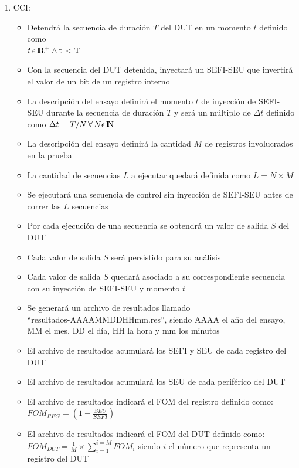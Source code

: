 \documentclass[
11pt, %
]{charter}
\begin{document}
\begin{enumerate}
	\item CCI:
	\begin{itemize}
		\item Detendrá la secuencia de duración $ T $ del DUT en un momento $ t $ definido como \\ $ t \, \epsilon \, \rm I\!R^+ \wedge t \, < T$
		\item Con la secuencia del DUT detenida, inyectará un SEFI-SEU que invertirá el valor de un bit de un registro interno
		\item La descripción del ensayo definirá el momento $ t $ de inyección de SEFI-SEU durante la secuencia de duración $ T $ y será un múltiplo de $\Delta t$ definido como $ \Delta t=T/N \, \forall \, N \epsilon \, \rm I\!N $
		\item La descripción del ensayo definirá la cantidad $ M $ de registros involucrados en la prueba
		\item La cantidad de secuencias $ L $ a ejecutar quedará definida como $ L = N \times M $
		\item Se ejecutará una secuencia de control sin inyección de SEFI-SEU antes de correr las $ L $ secuencias
		\item Por cada ejecución de una secuencia se obtendrá un valor de salida $ S $ del DUT
		\item Cada valor de salida $ S $ será persistido para su análisis
		\item Cada valor de salida $ S $ quedará asociado a su correspondiente secuencia con su inyección de SEFI-SEU y momento $ t $
		\item Se generará un archivo de resultados llamado\\ ``resultados-AAAAMMDDHHmm.res'', siendo AAAA el año del ensayo, MM el mes, DD el día, HH la hora y mm los minutos
		\item El archivo de resultados acumulará los SEFI y SEU de cada registro del DUT
		\item El archivo de resultados acumulará los SEU de cada periférico del DUT
		\item El archivo de resultados indicará el FOM del registro definido como: \\
		$ FOM_{REG} = (1 - \frac{SEU}{SEFI}) $
		\item El archivo de resultados indicará el FOM del DUT definido como: \\
		$ FOM_{DUT} = \frac{1}{M} \times \sum_{i = 1}^{i = M}FOM_{i} $ siendo $ i $ el número que representa un registro del DUT

\end{itemize}
\end{enumerate}
\end{document}
